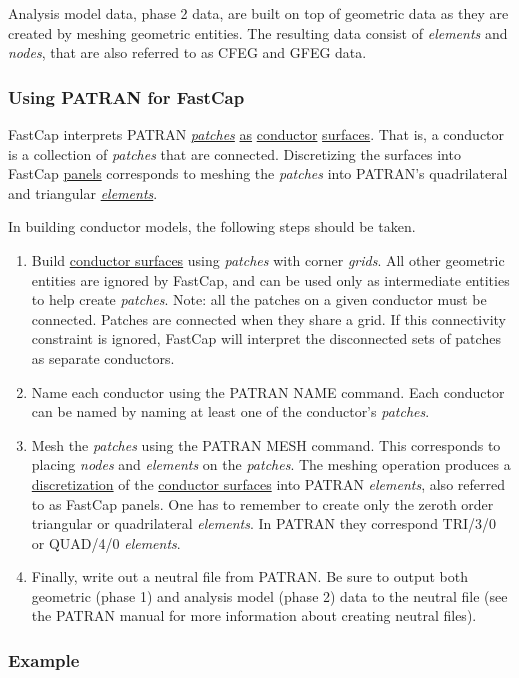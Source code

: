 Analysis model data, phase 2 data, are built on top of geometric data
as they are created by meshing geometric entities.  The resulting data
consist of {\em elements} and {\em nodes}, that are also referred to
as CFEG and GFEG data.

\subsubsection{Using PATRAN for FastCap}

FastCap interprets PATRAN \underline{\em patches} \underline{as}
\underline{conductor} \underline{surfaces}.  That is, a conductor is a
collection of {\em patches} that are connected.  Discretizing the
surfaces into FastCap \underline{panels} corresponds to meshing the
{\em patches} into PATRAN's quadrilateral and triangular
\underline{\em elements}.

In building conductor models, the following steps should be taken.
\begin{enumerate}
\item  
Build \underline{conductor surfaces} using {\em patches} with corner
{\em grids}.  All other geometric entities are ignored by FastCap, and
can be used only as intermediate entities to help create {\em
patches}. Note: all the patches on a given conductor must be connected.
Patches are connected when they share a grid. If this connectivity 
constraint is ignored, FastCap will interpret the disconnected sets of
patches as separate conductors.
\item  
Name each conductor using the PATRAN NAME command.  Each conductor
can be named by naming at least one of the conductor's {\em patches}.
\item 
Mesh the {\em patches} using the PATRAN MESH command.  This
corresponds to placing {\em nodes} and {\em elements} on the {\em
patches}.  The meshing operation produces a
\underline{discretization} of the \underline{conductor surfaces} into PATRAN
{\em elements}, also referred to as FastCap panels.  One has to
remember to create only the zeroth order triangular or quadrilateral
{\em elements}.  In PATRAN they correspond TRI/3/0 or QUAD/4/0 {\em
elements}.
\item  
Finally, write out a neutral file from PATRAN.  Be sure to output both
geometric (phase 1) and analysis model (phase 2) data to the neutral
file (see the PATRAN manual for more information about creating
neutral files).
\end{enumerate}

\subsubsection{Example}

